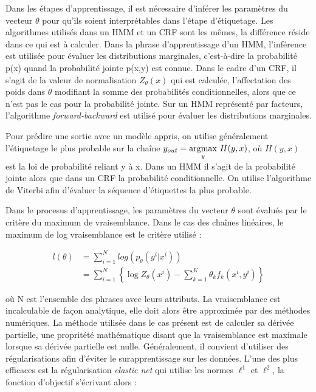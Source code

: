 \documentclass[PhD-Yoann-Dupont.tex]{subfiles}
\begin{document}
Dans les étapes d'apprentissage, il est nécessaire d'inférer les paramètres du vecteur $\theta$ pour qu'ils soient interprétables dans l'étape d'étiquetage. Les algorithmes utilisés dans un HMM et un CRF sont les mêmes, la différence réside dans ce qui est à calculer.
Dans la phrase d'apprentissage d'un HMM, l'inférence est utilisée pour évaluer les distributions marginales, c'est-à-dire la probabilité p(x) quand la probabilité jointe p(x,y) est connue. Dans le cadre d'un CRF, il s'agit de la valeur de normalisation $Z_{\theta}(x)$ qui est calculée, l'affectation des poids dans $\theta$ modifiant la somme des probabilités conditionnelles, alors que ce n'est pas le cas pour la probabilité jointe. Sur un HMM représenté par facteurs, l'algorithme \emph{forward-backward} \citep{baum1972equality,rabiner1986introduction} est utilisé pour évaluer les distributions marginales.

Pour prédire une sortie avec un modèle appris, on utilise généralement l'étiquetage le plus probable sur la chaîne $y_{out} = \underset{y}{\operatorname{argmax}}\ H(y, x)$, où $H(y, x)$ est la loi de probabilité reliant y à x. Dans un HMM il s'agit de la probabilité jointe alors que dans un CRF la probabilité conditionnelle. On utilise l'algorithme de Viterbi \citep{viterbi1967error,rabiner1986introduction} afin d'évaluer la séquence d'étiquettes la plus probable.

Dans le procesus d'apprentissage, les paramètres du vecteur $\theta$ sont évalués par le critère du maximum de vraisemblance. Dans le cas des chaînes linéaires, le maximum de log vraisemblance \citep{Lafferty01} est le critère utilisé :

\begin{equation} \label{eq:log-likelihood}
\begin{aligned}
l(\theta) &= \sum_{i=1}^{N} log(p_{\theta}(y^{i}|x^{i})) \\
          &= \sum_{i=1}^{N} \left \{ \log Z_{\theta}(x^{i}) - \sum_{k=1}^{K} \theta_{k}f_{k}(x^{i}, y^{i}) \right \}
\end{aligned}
\end{equation}

où N est l'ensemble des phrases avec leurs attributs. La vraisemblance est incalculable de façon analytique, elle doit alors être approximée par des méthodes numériques. La méthode utilisée dans le cas présent est de calculer sa dérivée partielle, une propritété mathématique disant que la vraisemblance est maximale lorsque sa dérivée partielle est nulle. Généralement, il convient d'utiliser des régularisations afin d'éviter le surapprentissage sur les données. L'une des plus efficaces est la régularisation \emph{elastic net} \citep{zou2005regularization} qui utilise les normes $\ell^{1}$ et $\ell^{2}$, la fonction d'objectif s'écrivant alors :
\end{document}
